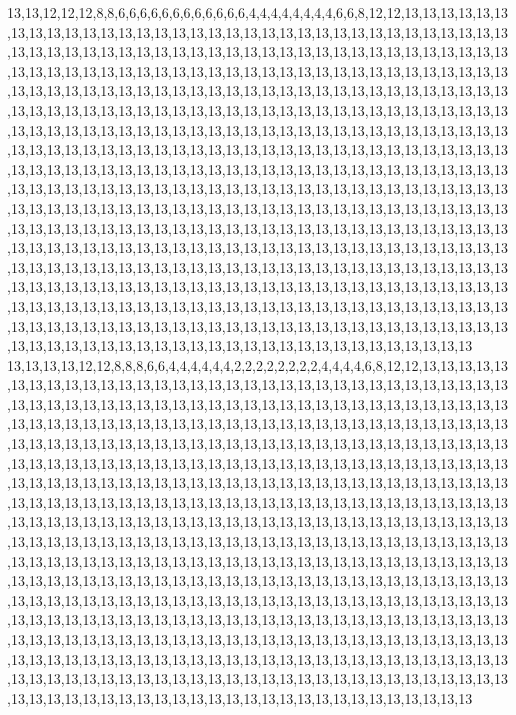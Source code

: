 13,13,12,12,12,8,8,6,6,6,6,6,6,6,6,6,6,6,6,4,4,4,4,4,4,4,4,6,6,8,12,12,13,13,13,13,13,13,13,13,13,13,13,13,13,13,13,13,13,13,13,13,13,13,13,13,13,13,13,13,13,13,13,13,13,13,13,13,13,13,13,13,13,13,13,13,13,13,13,13,13,13,13,13,13,13,13,13,13,13,13,13,13,13,13,13,13,13,13,13,13,13,13,13,13,13,13,13,13,13,13,13,13,13,13,13,13,13,13,13,13,13,13,13,13,13,13,13,13,13,13,13,13,13,13,13,13,13,13,13,13,13,13,13,13,13,13,13,13,13,13,13,13,13,13,13,13,13,13,13,13,13,13,13,13,13,13,13,13,13,13,13,13,13,13,13,13,13,13,13,13,13,13,13,13,13,13,13,13,13,13,13,13,13,13,13,13,13,13,13,13,13,13,13,13,13,13,13,13,13,13,13,13,13,13,13,13,13,13,13,13,13,13,13,13,13,13,13,13,13,13,13,13,13,13,13,13,13,13,13,13,13,13,13,13,13,13,13,13,13,13,13,13,13,13,13,13,13,13,13,13,13,13,13,13,13,13,13,13,13,13,13,13,13,13,13,13,13,13,13,13,13,13,13,13,13,13,13,13,13,13,13,13,13,13,13,13,13,13,13,13,13,13,13,13,13,13,13,13,13,13,13,13,13,13,13,13,13,13,13,13,13,13,13,13,13,13,13,13,13,13,13,13,13,13,13,13,13,13,13,13,13,13,13,13,13,13,13,13,13,13,13,13,13,13,13,13,13,13,13,13,13,13,13,13,13,13,13,13,13,13,13,13,13,13,13,13,13,13,13,13,13,13,13,13,13,13,13,13,13,13,13,13,13,13,13,13,13,13,13,13,13,13,13,13,13,13,13,13,13,13,13,13,13,13,13,13,13,13,13,13,13,13,13,13,13,13,13,13,13,13,13,13,13,13,13,13,13,13,13,13,13,13,13,13,13,13,13,13,13,13,13,13,13,13,13,13,13,13,13,13,13,13,13,13,13,13,13,13,13,13,13,13,13,13,13,13,13,13,13,13,13,13,13,13,13,13,13,13,13,13,13,13,13,13,13,13,13,13,13,13,13,13,13,13,13,13,13,13,13,13,13
13,13,13,13,12,12,8,8,8,6,6,4,4,4,4,4,4,2,2,2,2,2,2,2,2,4,4,4,4,6,8,12,12,13,13,13,13,13,13,13,13,13,13,13,13,13,13,13,13,13,13,13,13,13,13,13,13,13,13,13,13,13,13,13,13,13,13,13,13,13,13,13,13,13,13,13,13,13,13,13,13,13,13,13,13,13,13,13,13,13,13,13,13,13,13,13,13,13,13,13,13,13,13,13,13,13,13,13,13,13,13,13,13,13,13,13,13,13,13,13,13,13,13,13,13,13,13,13,13,13,13,13,13,13,13,13,13,13,13,13,13,13,13,13,13,13,13,13,13,13,13,13,13,13,13,13,13,13,13,13,13,13,13,13,13,13,13,13,13,13,13,13,13,13,13,13,13,13,13,13,13,13,13,13,13,13,13,13,13,13,13,13,13,13,13,13,13,13,13,13,13,13,13,13,13,13,13,13,13,13,13,13,13,13,13,13,13,13,13,13,13,13,13,13,13,13,13,13,13,13,13,13,13,13,13,13,13,13,13,13,13,13,13,13,13,13,13,13,13,13,13,13,13,13,13,13,13,13,13,13,13,13,13,13,13,13,13,13,13,13,13,13,13,13,13,13,13,13,13,13,13,13,13,13,13,13,13,13,13,13,13,13,13,13,13,13,13,13,13,13,13,13,13,13,13,13,13,13,13,13,13,13,13,13,13,13,13,13,13,13,13,13,13,13,13,13,13,13,13,13,13,13,13,13,13,13,13,13,13,13,13,13,13,13,13,13,13,13,13,13,13,13,13,13,13,13,13,13,13,13,13,13,13,13,13,13,13,13,13,13,13,13,13,13,13,13,13,13,13,13,13,13,13,13,13,13,13,13,13,13,13,13,13,13,13,13,13,13,13,13,13,13,13,13,13,13,13,13,13,13,13,13,13,13,13,13,13,13,13,13,13,13,13,13,13,13,13,13,13,13,13,13,13,13,13,13,13,13,13,13,13,13,13,13,13,13,13,13,13,13,13,13,13,13,13,13,13,13,13,13,13,13,13,13,13,13,13,13,13,13,13,13,13,13,13,13,13,13,13,13,13,13,13,13,13,13,13,13,13,13,13,13,13,13,13,13,13,13,13,13,13,13,13,13,13,13,13,13,13,13,13,13
